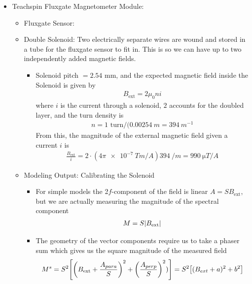 \documentclass[../main.tex]{subfiles}
\begin{document}
\begin{itemize}
    \item Teachspin Fluxgate Magnetometer Module:
    \begin{itemize}
        \item Fluxgate Sensor: 
        \item Double Solenoid: Two electrically separate wires are wound and stored in a tube for the fluxgate sensor to fit in. This is so we can have up to two independently added magnetic fields. 
        \begin{itemize}
            \item Solenoid pitch $= 2.54$ mm, and the expected magnetic field inside the Solenoid is given by
           \begin{align*}
               B_\text{ext} = 2 \mu_0 n i
           \end{align*} 
            where $i$ is the current through a solenoid, $2$ accounts for the doubled layer, and the turn density is
            \begin{align*}
                n = 1 \textrm{ turn} / (\qty{0.00254}{m} = \qty{394}{m^{-1}} 
            \end{align*}
            From this, the magnitude of the external magnetic field given a current $i$ is
            \begin{align*}
                \frac{B_\text{ext}}{i} = 2 \cdot (4 \pi \qty{e-7}{T m / A}) \qty{394}{/m} = \qty{990}{\micro T/A}
            \end{align*}
        \end{itemize}
        \item Modeling Output: Calibrating the Solenoid
        \begin{itemize}
            \item For simple models the 2$f$-component of the field is linear $A = S B_\text{ext}$, but we are actually measuring the magnitude of the spectral component
            \begin{align*}
                M = S \abs{B_\text{ext}}
            \end{align*}
            \item The geometry of the vector components require us to take a phaser sum which gives us the square magnitude of the measured field
            \begin{align*}
                M^s = S^2 \qt[
                    \qt(
                        B_\text{ext} + \frac{A_{para}}{S}
                    )^2 + \qt(
                        \frac{A_{perp}}{S}
                    )^2
                    )
                ] = S^2 \qt[(B_{ext} + a)^2 + b^2]
            \end{align*}
        \end{itemize}
    \end{itemize}
 
\end{itemize}
\end{document}
